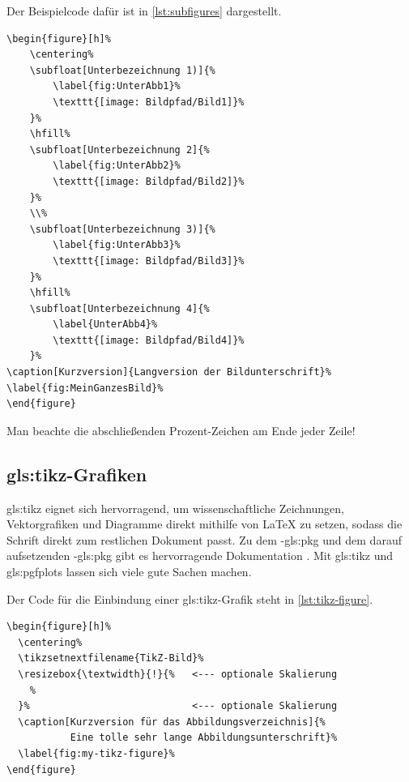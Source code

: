 Der Beispielcode dafür ist in \cref{lst:subfigures} dargestellt.

\begin{lstlisting}[float={htbp},caption={Unterabbildungen in LaTeX},label={lst:subfigures}]
\begin{figure}[h]%
	\centering%
	\subfloat[Unterbezeichnung 1)]{%
		\label{fig:UnterAbb1}%
		\texttt{[image: Bildpfad/Bild1]}%
	}%
	\hfill%
	\subfloat[Unterbezeichnung 2]{%
		\label{fig:UnterAbb2}%
		\texttt{[image: Bildpfad/Bild2]}%
	}%
	\\%
	\subfloat[Unterbezeichnung 3)]{%
		\label{fig:UnterAbb3}%
		\texttt{[image: Bildpfad/Bild3]}%
	}%
	\hfill%
	\subfloat[Unterbezeichnung 4]{%
		\label{UnterAbb4}%
		\texttt{[image: Bildpfad/Bild4]}%
	}%
\caption[Kurzversion]{Langversion der Bildunterschrift}%
\label{fig:MeinGanzesBild}%
\end{figure}
\end{lstlisting}

Man beachte die abschließenden Prozent-Zeichen am Ende jeder Zeile!

\subsection[TikZ-Grafiken]{\gls{gls:tikz}-Grafiken}%
\label{sec:TikZ}
%
\Gls{gls:tikz} eignet sich hervorragend, um wissenschaftliche Zeichnungen,
Vektorgrafiken und Diagramme direkt mithilfe von LaTeX
zu setzen, sodass die Schrift direkt zum restlichen Dokument passt.
Zu dem -\gls{gls:pkg} und dem darauf aufsetzenden -\gls{gls:pkg} gibt
es hervorragende Dokumentation \parencites{Tantau2013}{Feuersaenger2014}.
Mit \gls{gls:tikz} und \gls{gls:pgfplots} lassen sich viele gute Sachen machen.


Der Code für die Einbindung einer \gls{gls:tikz}-Grafik steht in \cref{lst:tikz-figure}.
\begin{lstlisting}[float={htbp},caption={Einbindung einer TikZ-Zeichnung in LaTeX},label={lst:tikz-figure}]
\begin{figure}[h]%
  \centering%
  \tikzsetnextfilename{TikZ-Bild}%
  \resizebox{\textwidth}{!}{%   <--- optionale Skalierung
    %
  }%                            <--- optionale Skalierung
  \caption[Kurzversion für das Abbildungsverzeichnis]{%
           Eine tolle sehr lange Abbildungsunterschrift}%
  \label{fig:my-tikz-figure}%
\end{figure}
\end{lstlisting}

